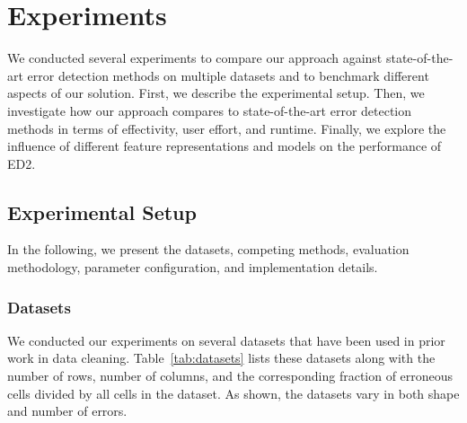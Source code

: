 \section{Experiments}
\label{sec:evaluation}

We conducted several experiments to compare our approach against state-of-the-art error detection methods on multiple datasets and to benchmark different aspects of our solution.
First, we describe the experimental setup. Then, we investigate how our approach compares to state-of-the-art error detection methods in terms of effectivity, user effort, and runtime. Finally, we explore the influence of different feature representations and models on the performance of ED2.


\subsection{Experimental Setup}
\label{sec:experimental_setup}

In the following, we present the datasets, competing methods, evaluation methodology, parameter configuration, and implementation details.

\subsubsection{Datasets}

We conducted our experiments on several datasets that have been used in prior work in data cleaning. 
Table~\ref{tab:datasets} lists these datasets along with the number of rows, number of columns, and the corresponding fraction of erroneous cells divided by all cells in the dataset. As shown, the datasets vary in both shape and number of errors.

